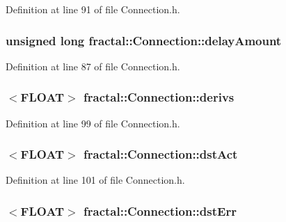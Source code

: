 Definition at line 91 of file Connection.\+h.

\hypertarget{classfractal_1_1Connection_aeed56c0faa379d9c695e49457b63bc03}{
\subsubsection[{delay\+Amount}]{\setlength{\rightskip}{0pt plus 5cm}unsigned long fractal\+::\+Connection\+::delay\+Amount\hspace{0.3cm}{\ttfamily [protected]}}}\label{classfractal_1_1Connection_aeed56c0faa379d9c695e49457b63bc03}


Definition at line 87 of file Connection.\+h.

\hypertarget{classfractal_1_1Connection_a31f6cf9d89d0c4166dc8bde044fafd00}{
\subsubsection[{derivs}]{$<${\bf F\+L\+O\+A\+T}$>$ fractal\+::\+Connection\+::derivs\hspace{0.3cm}{\ttfamily [protected]}}}\label{classfractal_1_1Connection_a31f6cf9d89d0c4166dc8bde044fafd00}


Definition at line 99 of file Connection.\+h.

\hypertarget{classfractal_1_1Connection_a7e99d505ee81e3c7c00dceb70efdf8bf}{
\subsubsection[{dst\+Act}]{$<${\bf F\+L\+O\+A\+T}$>$ fractal\+::\+Connection\+::dst\+Act\hspace{0.3cm}{\ttfamily [protected]}}}\label{classfractal_1_1Connection_a7e99d505ee81e3c7c00dceb70efdf8bf}


Definition at line 101 of file Connection.\+h.

\hypertarget{classfractal_1_1Connection_a2374b05f600966a36a1eec9b0946328d}{
\subsubsection[{dst\+Err}]{$<${\bf F\+L\+O\+A\+T}$>$ fractal\+::\+Connection\+::dst\+Err\hspace{0.3cm}{\ttfamily [protected]}}}\label{classfractal_1_1Connection_a2374b05f600966a36a1eec9b0946328d}


